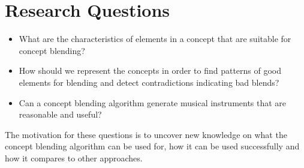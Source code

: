 
\section{Research Questions}
\begin{itemize}
\item What are the characteristics of elements in a concept that are suitable for concept blending?
\item How should we represent the concepts in order to find patterns of good elements for blending and detect contradictions indicating bad blends?
\item Can a concept blending algorithm generate musical instruments that are reasonable and useful?
\end{itemize}
The motivation for these questions is to uncover new knowledge on what the concept blending algorithm can be used for, how it can be used successfully and how it compares to other approaches.

